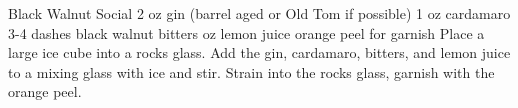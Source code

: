 \documentclass[../cookbook.tex]{subfiles}
\begin{document}
\begin{recipe}{Black Walnut Social}
\ingredients
{2 oz gin (barrel aged or Old Tom if possible)}
{1 oz cardamaro}
{3-4 dashes black walnut bitters}
{ oz lemon juice}
{orange peel for garnish}
\stopingredients
\preparation
{Place a large ice cube into a rocks glass.}
{Add the gin, cardamaro, bitters, and lemon juice to a mixing glass with ice and stir.}
{Strain into the rocks glass, garnish with the orange peel.}
\stopprep
\end{recipe}
\end{document}
